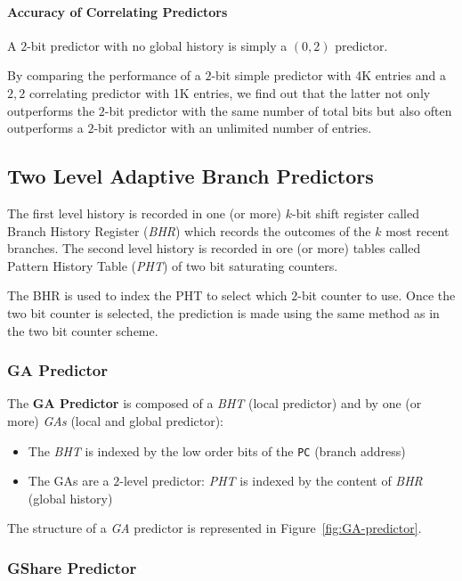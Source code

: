 \documentclass[english]{article}
\begin{document}
\paragraph{Accuracy of Correlating Predictors}

A \(2\)-bit predictor with no global history is simply a \((0, 2)\) predictor.

By comparing the performance of a \(2\)-bit simple predictor with 4K entries and a \(2, 2\) correlating predictor with 1K entries, we find out that the latter not only outperforms the \(2\)-bit predictor with the same number of total bits but also often outperforms a \(2\)-bit predictor with an unlimited number of entries.

\subsection{Two Level Adaptive Branch Predictors}

The first level history is recorded in one (or more) \(k\)-bit shift register called Branch History Register (\textit{BHR}) which records the outcomes of the \(k\) most recent branches.
The second level history is recorded in ore (or more) tables called Pattern History Table (\textit{PHT}) of two bit saturating counters.

The BHR is used to index the PHT to select which \(2\)-bit counter to use.
Once the two bit counter is selected, the prediction is made using the same method as in the two bit counter scheme.

\subsubsection{GA Predictor}

The \textbf{GA Predictor} is composed of a \textit{BHT} (local predictor) and by one (or more) \textit{GAs} (local and global predictor):

\begin{itemize}
  \item The \textit{BHT} is indexed by the low order bits of the \texttt{PC} (branch address)
  \item The GAs are a \(2\)-level predictor: \textit{PHT} is indexed by the content of \textit{BHR} (global history)
\end{itemize}

The structure of a \textit{GA} predictor is represented in Figure~\ref{fig:GA-predictor}.

\subsubsection{GShare Predictor}
\end{document}
